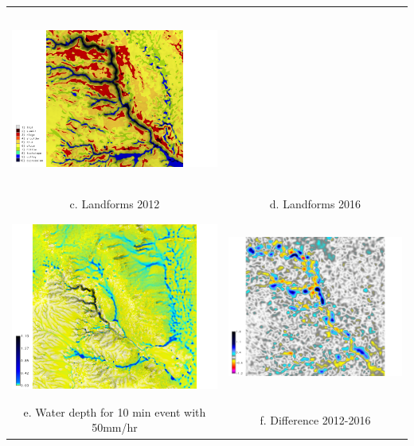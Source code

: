 \documentclass{standalone}
\begin{document}
\begin{tabular}{m{} m{}}
\includegraphics[height=60mm,center]{../../images/sample_data/gully_landforms_2016.png}\\
\multicolumn{1}{c}{c. Landforms 2012} & \multicolumn{1}{c}{d. Landforms 2016}\\
%
\multicolumn{1}{c}{\includegraphics[height=60mm]{../../images/sample_data/depth_2016.png}} &
\multicolumn{1}{c}{\includegraphics[height=60mm]{../../images/sample_data/gully_difference_2012_2016.png}}\\
\multicolumn{1}{c}{e. Water depth for 10 min event with 50mm/hr} & \multicolumn{1}{c}{f. Difference 2012-2016}\\
%
\end{tabular}
\end{document}
